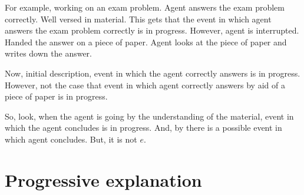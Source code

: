 \begin{note}
  For example, working on an exam problem.
  Agent answers the exam problem correctly.
  Well versed in material.
  This gets that the event in which agent answers the exam problem correctly is in progress.
  However, agent is interrupted.
  Handed the answer on a piece of paper.
  Agent looks at the piece of paper and writes down the answer.

  Now, initial description, event in which the agent correctly answers is in progress.
  However, not the case that event in which agent correctly answers by aid of a piece of paper is in progress.

  So, look, when the agent is going by the understanding of the material, event in which the agent concludes is in progress.
  And, by \assuPP{} there is a possible event in which agent concludes.
  But, it is not \(e\).
\end{note}




\section{Progressive explanation}
\label{sec:what-these-do}

